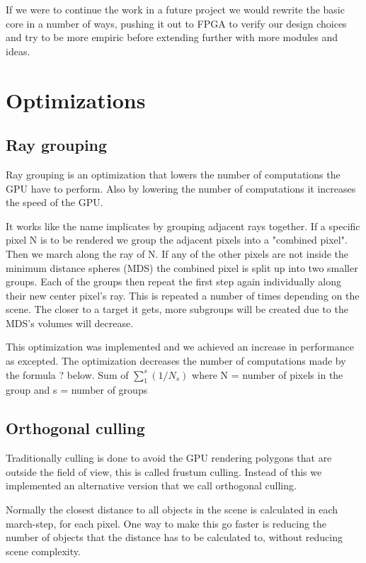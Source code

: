 			If we were to continue the work in a future project we would
			rewrite the basic core in a number of ways, pushing it out to FPGA
			to verify our design choices and try to be more empiric before
			extending further with more modules and ideas. 

	\section{Optimizations}

		\subsection{Ray grouping}
		
			Ray grouping is an optimization that lowers the number of
			computations the GPU have to perform. Also by lowering the number of
			computations it increases the speed of the GPU.
			
			It works like the name implicates by grouping adjacent rays
			together. If a specific pixel N is to be rendered we group the
			adjacent pixels into a "combined pixel". Then we march along the
			ray of N. If any of the other pixels are not inside the minimum
			distance spheres (MDS) the combined pixel is split up into two
			smaller groups. Each of the groups then repeat the first step again
			individually along their new center pixel's ray. This is repeated a
			number of times depending on the scene.  The closer to a target it
			gets, more subgroups will be created due to the MDS's volumes will
			decrease.
			
			This optimization was implemented and we achieved an increase in
			performance as excepted. The optimization decreases the number of
			computations made by the formula ? below.  Sum of $\sum_1^s(1/N_s)$
			where N = number of pixels in the group and s = number of groups


		\subsection{Orthogonal culling}

			Traditionally culling is done to avoid the GPU rendering polygons 
			that are outside the field of view, this is called frustum culling. Instead 
			of this we implemented an alternative version that we call orthogonal
			culling.

			Normally the closest distance to all objects in the scene is calculated
			in each march-step, for each pixel. One way to make this go faster is 
			reducing the number of objects that the distance has to be calculated 
			to, without reducing scene complexity. 


